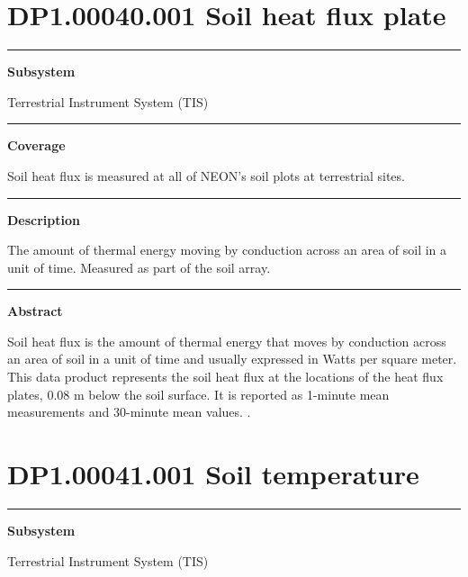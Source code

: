 \documentclass[]{article}
\begin{document}
\section{DP1.00040.001 Soil heat flux
plate}\label{dp1.00040.001-soil-heat-flux-plate}

\begin{center}\rule{0.5\linewidth}{\linethickness}\end{center}

\textbf{Subsystem}

Terrestrial Instrument System (TIS)

\begin{center}\rule{0.5\linewidth}{\linethickness}\end{center}

\textbf{Coverage}

Soil heat flux is measured at all of NEON's soil plots at terrestrial
sites.

\begin{center}\rule{0.5\linewidth}{\linethickness}\end{center}

\textbf{Description}

The amount of thermal energy moving by conduction across an area of soil
in a unit of time. Measured as part of the soil array.

\begin{center}\rule{0.5\linewidth}{\linethickness}\end{center}

\textbf{Abstract}

Soil heat flux is the amount of thermal energy that moves by conduction
across an area of soil in a unit of time and usually expressed in Watts
per square meter. This data product represents the soil heat flux at the
locations of the heat flux plates, 0.08 m below the soil surface. It is
reported as 1-minute mean measurements and 30-minute mean values.
\newpage
.

\section{DP1.00041.001 Soil
temperature}\label{dp1.00041.001-soil-temperature}

\begin{center}\rule{0.5\linewidth}{\linethickness}\end{center}

\textbf{Subsystem}

Terrestrial Instrument System (TIS)
\end{document}
